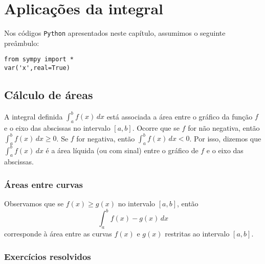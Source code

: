 
\chapter{Aplicações da integral}\label{cap_apint}
\thispagestyle{fancy}

\ifispython
\begin{obs}\label{obs:cap_apint_python}
  Nos códigos \verb+Python+ apresentados neste capítulo, assumimos o seguinte preâmbulo:
\begin{verbatim}
from sympy import *
var('x',real=True)
\end{verbatim}
\end{obs}
\fi

\section{Cálculo de áreas}\label{cap_apint_sec_areas}

A integral definida $\int_a^b f(x)\,dx$ está associada a área entre o gráfico da função $f$ e o eixo das abscissas no intervalo $[a,b]$. Ocorre que se $f$ for não negativa, então $\int_a^b f(x)\,dx \geq 0$. Se $f$ for negativa, então $\int_a^b f(x)\,dx < 0$. Por isso, dizemos que $\int_a^b f(x)\,dx$ é a área líquida (ou com sinal) entre o gráfico de $f$ e o eixo das abscissas.

\emconstrucao

\subsection{Áreas entre curvas}

Observamos que se $f(x)\geq g(x)$ no intervalo $[a, b]$, então
\begin{equation}
  \int_a^b f(x)-g(x)\,dx
\end{equation}
corresponde à área entre as curvas $f(x)$ e $g(x)$ restritas ao intervalo $[a,b]$.

\emconstrucao

\subsection*{Exercícios resolvidos}

